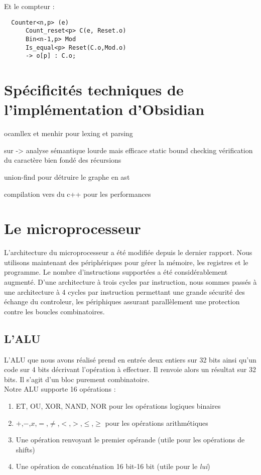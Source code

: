\documentclass[13pt]{article}
\begin{document}
Et le compteur :
\begin{verbatim}
  Counter<n,p> (e)
      Count_reset<p> C(e, Reset.o)
      Bin<n-1,p> Mod
      Is_equal<p> Reset(C.o,Mod.o)
      -> o[p] : C.o;
\end{verbatim}


\section{Spécificités techniques de l'implémentation d'Obsidian}

ocamllex et menhir pour lexing et parsing

sur -> analyse sémantique lourde mais efficace
    static bound checking
    vérification du caractère bien fondé des récursions

union-find pour détruire le graphe en ast

compilation vers du c++ pour les performances

\section{Le microprocesseur}

L'architecture du microprocesseur a été modifiée depuis le dernier rapport.
Nous utilisons maintenant des périphériques pour gérer la mémoire, les registres
et le programme. Le nombre d'instructions supportées a été considérablement 
augmenté. D'une architecture à trois cycles par instruction, nous sommes passés
à une architecture à 4 cycles par instruction permettant une grande sécurité des
échange du controleur, les périphiques assurant parallèlement une protection contre
les boucles combinatoires.

\subsection{L'ALU}

L’ALU que nous avons réalisé prend en entrée deux entiers sur
32 bits ainsi qu’un code sur 4 bits décrivant l’opération à effectuer. Il renvoie
alors un résultat sur 32 bits. Il s’agit d’un bloc purement combinatoire.\\

Notre ALU supporte 16 opérations :

\begin{enumerate}
\item ET, OU, XOR, NAND, NOR pour les opérations logiques binaires
\item $+$,$-$,$x$,$=$,$\neq$,$<$,$>$,$\leq$,$\geq$ pour les opérations arithmétiques
\item Une opération renvoyant le premier opérande (utile pour les opérations de shifts)
\item Une opération de concaténation 16 bit-16 bit (utile pour le \textit{lui})
\end{enumerate}  
\end{document}
